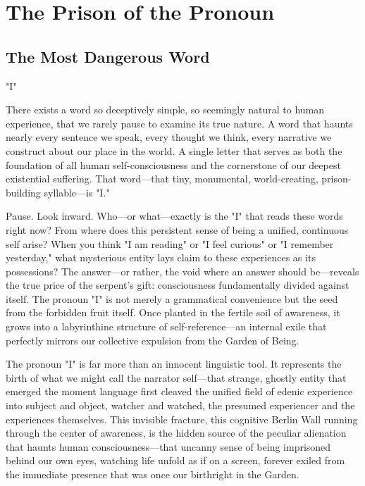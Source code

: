 \chapter{The Prison of the Pronoun}

\section{The Most Dangerous Word}

"I"

There exists a word so deceptively simple, so seemingly natural to human experience, that we rarely pause to examine its true nature. A word that haunts nearly every sentence we speak, every thought we think, every narrative we construct about our place in the world. A single letter that serves as both the foundation of all human self-consciousness and the cornerstone of our deepest existential suffering. That word—that tiny, monumental, world-creating, prison-building syllable—is "I."

Pause. Look inward. Who—or what—exactly is the "I" that reads these words right now? From where does this persistent sense of being a unified, continuous self arise? When you think "I am reading" or "I feel curious" or "I remember yesterday," what mysterious entity lays claim to these experiences as its possessions? The answer—or rather, the void where an answer should be—reveals the true price of the serpent's gift: consciousness fundamentally divided against itself. The pronoun "I" is not merely a grammatical convenience but the seed from the forbidden fruit itself. Once planted in the fertile soil of awareness, it grows into a labyrinthine structure of self-reference—an internal exile that perfectly mirrors our collective expulsion from the Garden of Being.

The pronoun "I" is far more than an innocent linguistic tool. It represents the birth of what we might call the narrator self—that strange, ghostly entity that emerged the moment language first cleaved the unified field of edenic experience into subject and object, watcher and watched, the presumed experiencer and the experiences themselves. This invisible fracture, this cognitive Berlin Wall running through the center of awareness, is the hidden source of the peculiar alienation that haunts human consciousness—that uncanny sense of being imprisoned behind our own eyes, watching life unfold as if on a screen, forever exiled from the immediate presence that was once our birthright in the Garden.

